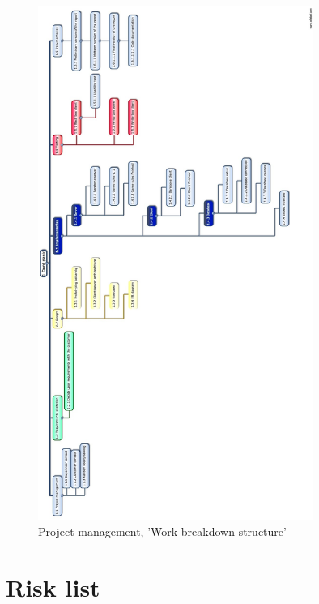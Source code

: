 \begin{figure}[H]
  \centering
    \includegraphics[width=0.8\textwidth]{img/wbs.jpeg}
  \caption{Project management, 'Work breakdown structure'} 
  \label{fig:WBS}
\end{figure}


\section{Risk list}


